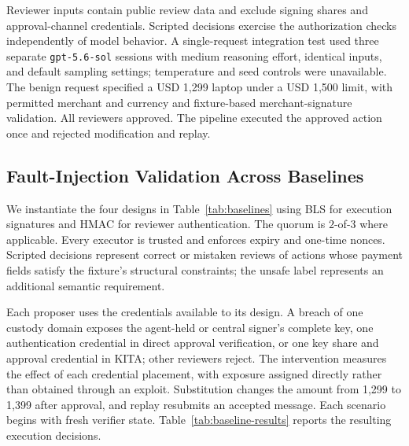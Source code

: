 \documentclass{article}
\begin{document}
Reviewer inputs contain public review data and exclude signing shares and
approval-channel credentials. Scripted decisions exercise the authorization
checks independently of model behavior. A single-request integration test
used three separate \texttt{gpt-5.6-sol} sessions with medium reasoning effort,
identical inputs, and default sampling settings; temperature and seed controls
were unavailable. The benign request specified a USD 1,299 laptop under a
USD 1,500 limit, with permitted merchant and currency and fixture-based
merchant-signature validation. All reviewers approved. The pipeline executed
the approved action once and rejected modification and replay.

\subsection{Fault-Injection Validation Across Baselines}
\label{app:baseline-tests}

We instantiate the four designs in Table~\ref{tab:baselines} using BLS for
execution signatures and HMAC for reviewer authentication. The quorum is
$2$-of-$3$ where applicable. Every executor is trusted and enforces expiry
and one-time nonces. Scripted decisions represent correct or mistaken reviews
of actions whose payment fields satisfy the fixture's structural constraints;
the unsafe label represents an additional semantic requirement.

Each proposer uses the credentials available to its design. A breach of one
custody domain exposes the agent-held or central signer's complete key, one
authentication credential in direct approval verification, or one key share
and approval credential in \textsf{KITA}; other reviewers reject. The intervention
measures the effect of each credential placement, with exposure assigned
directly rather than obtained through an exploit. Substitution changes the
amount from 1,299 to 1,399 after approval, and replay resubmits an accepted
message. Each scenario begins with fresh verifier state.
Table~\ref{tab:baseline-results} reports the resulting execution decisions.
\end{document}
